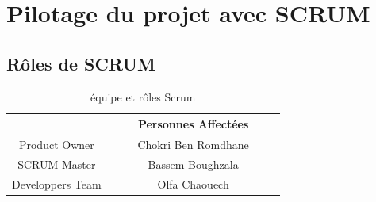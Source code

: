 \section{Pilotage du projet avec SCRUM}
\subsection{Rôles de SCRUM}
\begin{table}[!h]
	\centering %
	\begin{tabular}{ |c|c| } 
		
		
		\hline%
		\centering{\textbf{~~~~Rôle SCRUM~~~~}} & \textbf{~~~~Personnes Affectées~~~~} \\
		\hline
		Product Owner & Chokri Ben Romdhane\\ 
		\hline  
		SCRUM Master & Bassem Boughzala   \\ 
		\hline
		Developpers Team & Olfa Chaouech  \\
		\hline
		
		
		
	\end{tabular}
	
	\caption{équipe et rôles Scrum}
\end{table}

